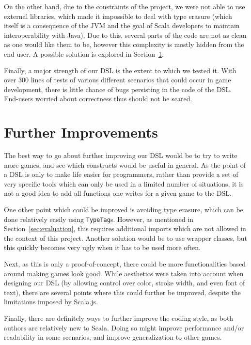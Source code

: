 \documentclass[journal,onecolumn, 9pt]{IEEEtran}
\theoremstyle{definition}
\newcommand{\scala}[1]{\texttt{#1}}
\begin{document}
On the other hand, due to the constraints of the project, we were not able to use external libraries, which made it impossible to deal with type erasure (which itself is a consequence of the JVM and the goal of Scala developers to maintain interoperability with Java).
Due to this, several parts of the code are not as clean as one would like them to be, however this complexity is mostly hidden from the end user.
A possible solution is explored in Section~\ref{sec:improvements}.

Finally, a major strength of our DSL is the extent to which we tested it.
With over 300 lines of tests of various different scenarios that could occur in game development, there is little chance of bugs persisting in the code of the DSL.
End-users worried about correctness thus should not be scared.

\section{Further Improvements}
\label{sec:improvements}
The best way to go about further improving our DSL would be to try to write more games, and see which constructs would be useful in general.
As the point of a DSL is only to make life easier for programmers, rather than provide a set of very specific tools which can only be used in a limited number of situations, it is not a good idea to add all functions one writes for a given game to the DSL.

One other point which could be improved is avoiding type erasure, which can be done relatively easily using \scala{TypeTag}s.
However, as mentioned in Section~\ref{sec:evaluation}, this requires additional imports which are not allowed in the context of this project.
Another solution would be to use wrapper classes, but this quickly becomes very ugly when it has to be used more often.

Next, as this is only a proof-of-concept, there could be more functionalities based around making games look good.
While aesthetics were taken into account when designing our DSL (by allowing control over color, stroke width, and even font of text), there are several points where this could further be improved, despite the limitations imposed by Scala.js.

Finally, there are definitely ways to further improve the coding style, as both authors are relatively new to Scala.
Doing so might improve performance and/or readability in some scenarios, and improve generalization to other games.
\end{document}
